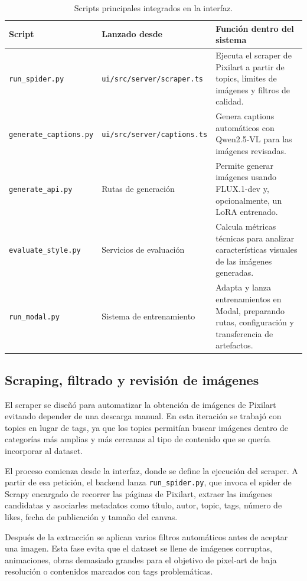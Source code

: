 \documentclass[a4paper,11pt,titlepage]{scrbook}
\newcommand{\estilotabla}{%
    \small
    \setlength{\tabcolsep}{4pt}
    \renewcommand{\arraystretch}{1.15}
}
\begin{document}
\begin{table}[htbp]
\centering
\estilotabla
\begin{tabular}{|L{0.28\textwidth}|L{0.27\textwidth}|L{0.35\textwidth}|}
\hline
\textbf{Script} & \textbf{Lanzado desde} & \textbf{Función dentro del sistema} \\
\hline
\texttt{run\_spider.py} & \texttt{ui/src/server/scraper.ts} & Ejecuta el scraper de Pixilart a partir de topics, límites de imágenes y filtros de calidad. \\
\hline
\texttt{generate\_captions.py} & \texttt{ui/src/server/captions.ts} & Genera captions automáticos con Qwen2.5-VL para las imágenes revisadas. \\
\hline
\texttt{generate\_api.py} & Rutas de generación & Permite generar imágenes usando FLUX.1-dev y, opcionalmente, un LoRA entrenado. \\
\hline
\texttt{evaluate\_style.py} & Servicios de evaluación & Calcula métricas técnicas para analizar características visuales de las imágenes generadas. \\
\hline
\texttt{run\_modal.py} & Sistema de entrenamiento & Adapta y lanza entrenamientos en Modal, preparando rutas, configuración y transferencia de artefactos. \\
\hline
\end{tabular}
\caption{Scripts principales integrados en la interfaz.}
\label{tab:scripts_iteracion3}
\end{table}

\subsection{Scraping, filtrado y revisión de imágenes}

El scraper se diseñó para automatizar la obtención de imágenes de Pixilart evitando depender de una descarga manual. En esta iteración se trabajó con topics en lugar de tags, ya que los topics permitían buscar imágenes dentro de categorías más amplias y más cercanas al tipo de contenido que se quería incorporar al dataset.


El proceso comienza desde la interfaz, donde se define la ejecución del scraper. A partir de esa petición, el backend lanza \texttt{run\_spider.py}, que invoca el spider de Scrapy encargado de recorrer las páginas de Pixilart, extraer las imágenes candidatas y asociarles metadatos como título, autor, topic, tags, número de likes, fecha de publicación y tamaño del canvas.

Después de la extracción se aplican varios filtros automáticos antes de aceptar una imagen. Esta fase evita que el dataset se llene de imágenes corruptas, animaciones, obras demasiado grandes para el objetivo de pixel-art de baja resolución o contenidos marcados con tags problemáticas.
\end{document}

